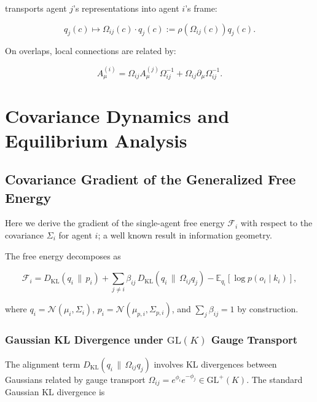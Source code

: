 \documentclass[twoside,11pt]{article}
\begin{document}
transports agent $j$'s representations into agent $i$'s frame:

\begin{equation}
q_j(c) \mapsto \Omega_{ij}(c) \cdot q_j(c) := \rho(\Omega_{ij}(c)) q_j(c).
\end{equation}

On overlaps, local connections are related by:

\begin{equation}
A^{(i)}_\mu = \Omega_{ij} A^{(j)}_\mu \Omega_{ij}^{-1} + \Omega_{ij} \partial_\mu \Omega_{ij}^{-1}.
\end{equation}



\section{Covariance Dynamics and Equilibrium Analysis}
\label{app:covariance_dynamics}

\subsection{Covariance Gradient of the Generalized Free Energy}

Here we derive the gradient of the single-agent free energy $\mathcal{F}_i$ with respect to the covariance $\Sigma_i$ for agent $i$; a well known result in information geometry.

The free energy decomposes as

\begin{equation}
\mathcal{F}_i
=D_{\mathrm{KL}}(q_i \,\|\, p_i)
+ \sum_{j \neq i} \beta_{ij}\,
D_{\mathrm{KL}}(q_i \,\|\, \Omega_{ij} q_j)
- \mathbb{E}_{q_i}[\log p(o_i \mid k_i)],
\end{equation}

where $q_i = \mathcal{N}(\mu_i, \Sigma_i)$, $p_i = \mathcal{N}(\mu_{p,i}, \Sigma_{p,i})$, and $\sum_j \beta_{ij} = 1$ by construction.

\subsubsection{Gaussian KL Divergence under $\mathrm{GL}(K)$ Gauge Transport}

The alignment term $D_{\mathrm{KL}}(q_i \,\|\, \Omega_{ij} q_j)$ involves KL divergences between Gaussians related by gauge transport $\Omega_{ij} = e^{\phi_i}e^{-\phi_j} \in \mathrm{GL}^+(K)$. The standard Gaussian KL divergence is
\end{document}
